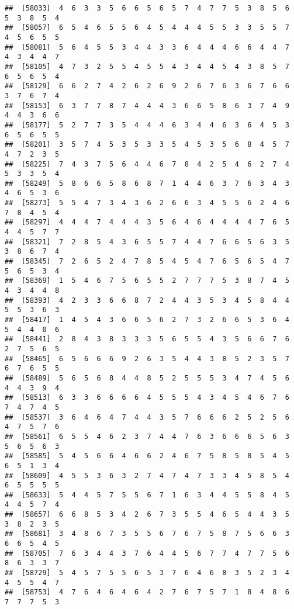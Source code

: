 \documentclass[
]{book}
\begin{document}
\begin{verbatim}
##  [58033]  4  6  3  3  5  6  6  5  6  5  7  4  7  7  5  3  8  5  6  5  3  8  5  4
##  [58057]  6  5  4  6  5  5  6  4  5  4  4  4  5  5  3  3  5  5  7  4  5  6  5  5
##  [58081]  5  6  4  5  5  3  4  4  3  3  6  4  4  4  6  6  4  4  7  4  3  4  4  7
##  [58105]  4  7  3  2  5  5  4  5  5  4  3  4  4  5  4  3  8  5  7  6  5  6  5  4
##  [58129]  6  6  2  7  4  2  6  2  6  9  2  6  7  6  3  6  7  6  6  3  7  6  7  4
##  [58153]  6  3  7  7  8  7  4  4  4  3  6  6  5  8  6  3  7  4  9  4  4  3  6  6
##  [58177]  5  2  7  7  3  5  4  4  4  6  3  4  4  6  3  6  4  5  3  6  5  6  5  5
##  [58201]  3  5  7  4  5  3  5  3  3  5  4  5  3  5  6  8  4  5  7  4  7  2  3  5
##  [58225]  7  4  3  7  5  6  4  4  6  7  8  4  2  5  4  6  2  7  4  5  3  3  5  4
##  [58249]  5  8  6  6  5  8  6  8  7  1  4  4  6  3  7  6  3  4  3  4  6  5  3  6
##  [58273]  5  5  4  7  3  4  3  6  2  6  6  3  4  5  5  6  2  4  6  7  8  4  5  4
##  [58297]  4  4  4  7  4  4  4  3  5  6  4  6  4  4  4  4  7  6  5  4  4  5  7  7
##  [58321]  7  2  8  5  4  3  6  5  5  7  4  4  7  6  6  5  6  3  5  3  8  6  7  4
##  [58345]  7  2  6  5  2  4  7  8  5  4  5  4  7  6  5  6  5  4  7  5  6  5  3  4
##  [58369]  1  5  4  6  7  5  6  5  5  2  7  7  7  5  3  8  7  4  5  4  3  4  4  8
##  [58393]  4  2  3  3  6  6  8  7  2  4  4  3  5  3  4  5  8  4  4  5  5  3  6  3
##  [58417]  1  4  5  4  3  6  6  5  6  2  7  3  2  6  6  5  3  6  4  5  4  4  0  6
##  [58441]  2  8  4  3  8  3  3  3  5  6  5  5  4  3  5  6  6  7  6  2  7  5  6  5
##  [58465]  6  5  6  6  6  9  2  6  3  5  4  4  3  8  5  2  3  5  7  6  7  6  5  5
##  [58489]  5  6  5  6  8  4  4  8  5  2  5  5  5  3  4  7  4  5  6  4  4  3  9  4
##  [58513]  6  3  3  6  6  6  6  4  5  5  5  4  3  4  5  4  6  7  6  7  4  7  4  5
##  [58537]  3  6  4  6  4  7  4  4  3  5  7  6  6  6  2  5  2  5  6  4  7  5  7  6
##  [58561]  6  5  5  4  6  2  3  7  4  4  7  6  3  6  6  6  5  6  3  5  6  5  6  3
##  [58585]  5  4  5  6  6  4  6  6  2  4  6  7  5  8  5  8  5  4  5  6  5  1  3  4
##  [58609]  4  5  5  3  6  3  2  7  4  7  4  7  3  3  4  5  8  5  4  6  5  5  5  5
##  [58633]  5  4  4  5  7  5  5  6  7  1  6  3  4  4  5  5  8  4  5  4  4  5  7  4
##  [58657]  6  6  8  5  3  4  2  6  7  3  5  5  4  6  5  4  4  3  5  3  8  2  3  5
##  [58681]  3  4  8  6  7  3  5  5  6  7  6  7  5  8  7  5  6  6  3  6  6  5  4  5
##  [58705]  7  6  3  4  4  3  7  6  4  4  5  6  7  7  4  7  7  5  6  8  6  3  3  7
##  [58729]  5  4  5  7  5  5  6  5  3  7  6  4  6  8  3  5  2  3  4  4  5  5  4  7
##  [58753]  4  7  6  4  6  4  6  4  2  7  6  7  5  7  1  8  4  8  6  7  7  7  5  3

\end{verbatim}
\end{document}
